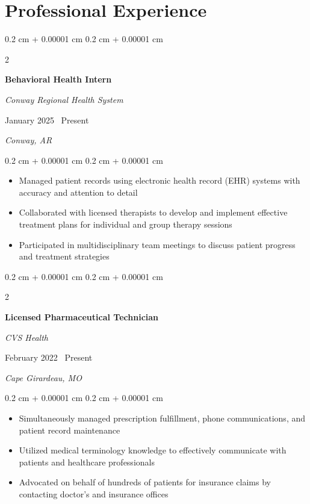 \documentclass[10pt, letterpaper]{article}
\newenvironment{highlights}{
    \begin{itemize}[
        topsep=0.10 cm,
        parsep=0.10 cm,
        partopsep=0pt,
        itemsep=0pt,
        leftmargin=0.4 cm + 10pt
    ]
}{
    \end{itemize}
} %
\newenvironment{onecolentry}{
    \begin{adjustwidth}{
        0.2 cm + 0.00001 cm
    }{
        0.2 cm + 0.00001 cm
    }
}{
    \end{adjustwidth}
} %
\newenvironment{twocolentry}[2][]{
    \onecolentry
    \def\secondColumn{#2}
    \setcolumnwidth{\fill, 4.5 cm}
    \begin{paracol}{2}
}{
    \switchcolumn \raggedleft \secondColumn
    \end{paracol}
    \endonecolentry
} %
\begin{document}
\section{Professional Experience}

\begin{twocolentry}
    {
        January 2025 \textendash\ Present

        \textit{Conway, AR}
    }
    \textbf{Behavioral Health Intern}

    \textit{Conway Regional Health System}
\end{twocolentry}

\vspace{0.10 cm}

\begin{onecolentry}
    \begin{highlights}
        \item Managed patient records using electronic health record (EHR) systems with accuracy and attention to detail
        \item Collaborated with licensed therapists to develop and implement effective treatment plans for individual and group therapy sessions
        \item Participated in multidisciplinary team meetings to discuss patient progress and treatment strategies
        \end{highlights}
\end{onecolentry}

\vspace{0.2 cm}

\begin{twocolentry}
    {
        February 2022 \textendash\ Present

        \textit{Cape Girardeau, MO}
    }
    \textbf{Licensed Pharmaceutical Technician}

    \textit{CVS Health}
\end{twocolentry}

\vspace{0.10 cm}
\begin{onecolentry}
    \begin{highlights}
        \item Simultaneously managed prescription fulfillment, phone communications, and patient record maintenance
        \item Utilized medical terminology knowledge to effectively communicate with patients and healthcare professionals
        \item Advocated on behalf of hundreds of patients for insurance claims by contacting doctor's and insurance offices
    \end{highlights}
\end{onecolentry}
\end{document}
